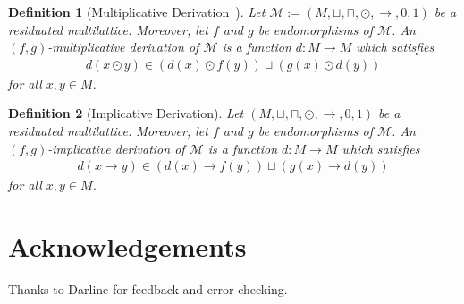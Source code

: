 \documentclass{article}
\newtheorem{definition}{Definition}
\begin{document}
\begin{definition}[Multiplicative Derivation~\cite{YFL22}]
Let $\mathcal{M} := (M,\sqcup,\sqcap,\odot,\rightarrow,0,1)$ be a residuated multilattice. Moreover, let $f$ and $g$ be endomorphisms of $\mathcal{M}$.
An {$(f,g)$-multiplicative derivation} of $\mathcal{M}$ is a function $d:M \rightarrow M$ which satisfies
\begin{align}
d(x \odot y) \in (d(x) \odot f(y)) \sqcup (g(x) \odot d(y))
\end{align}
for all $x,y \in M$.
\end{definition}

\begin{definition}[Implicative Derivation]
Let $(M,\sqcup,\sqcap,\odot,\rightarrow,0,1)$ be a residuated multilattice. Moreover, let $f$ and $g$ be endomorphisms of $\mathcal{M}$.
An \emph{$(f,g)$-implicative derivation} of $\mathcal{M}$ is a function $d:M \rightarrow M$ which satisfies
\begin{align}
d(x \rightarrow y) \in (d(x) \rightarrow f(y)) \sqcup (g(x) \rightarrow d(y))
\end{align}
for all $x,y \in M$.
\end{definition}

\section*{Acknowledgements}
Thanks to Darline for feedback and error checking.



\end{document}
